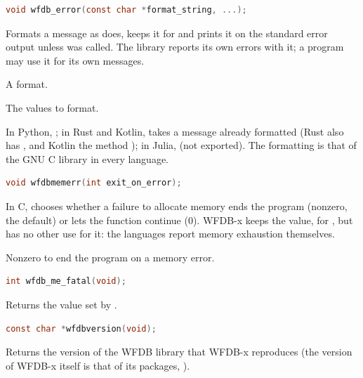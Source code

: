 \begin{lstlisting}[language=C,style=signature]
void wfdb_error(const char *format_string, ...);
\end{lstlisting}
Formats a message as  does, keeps it for  and
prints it on the standard error output unless  was called.
The library reports its own errors with it; a program may use it for its
own messages.
\begin{params}
\item[format\_string] A  format.
\item[...] The values to format.
\end{params}

In Python, ; in Rust and Kotlin,
 takes a message already formatted (Rust also has
, and Kotlin the method
); in Julia,  (not exported). The formatting is that of the GNU C library in
every language.

\begin{lstlisting}[language=C,style=signature]
void wfdbmemerr(int exit_on_error);
\end{lstlisting}
In C, chooses whether a failure to allocate memory ends the program (nonzero,
the default) or lets the function continue (0). WFDB-x keeps the value, for
, but has no other use for it: the languages report
memory exhaustion themselves.
\begin{params}
\item[exit\_on\_error] Nonzero to end the program on a memory error.
\end{params}

\begin{lstlisting}[language=C,style=signature]
int wfdb_me_fatal(void);
\end{lstlisting}
Returns the value set by .

\begin{lstlisting}[language=C,style=signature]
const char *wfdbversion(void);
\end{lstlisting}
Returns the version of the WFDB library that WFDB-x reproduces (the version
of WFDB-x itself is that of its packages, \wfdbxversion).

